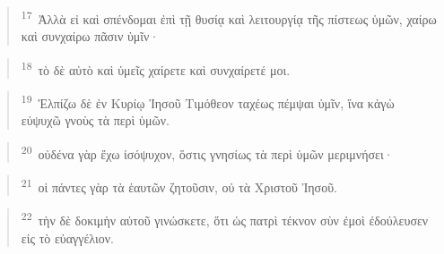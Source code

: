 \documentclass{article}
\newcommand{\currentverse}{1} %
\newcommand{\setcurrentverse}[1]{\renewcommand{\currentverse}{#1}}
\begin{document}
\begin{verse}

\setcurrentverse{17}

\setcounter{footnote}{0}

\textsuperscript{17}~Ἀλλὰ εἰ καὶ σπένδομαι ἐπὶ τῇ θυσίᾳ καὶ λειτουργίᾳ τῆς πίστεως ὑμῶν, χαίρω καὶ συνχαίρω πᾶσιν ὑμῖν·

\end{verse}

\begin{verse}

\setcurrentverse{18}

\setcounter{footnote}{0}

\textsuperscript{18}~τὸ δὲ αὐτὸ καὶ ὑμεῖς χαίρετε καὶ συνχαίρετέ μοι.

\end{verse}

\begin{verse}

\setcurrentverse{19}

\setcounter{footnote}{0}

\textsuperscript{19}~Ἐλπίζω δὲ ἐν Κυρίῳ Ἰησοῦ Τιμόθεον ταχέως πέμψαι ὑμῖν, ἵνα κἀγὼ εὐψυχῶ γνοὺς τὰ περὶ ὑμῶν.

\end{verse}

\begin{verse}

\setcurrentverse{20}

\setcounter{footnote}{0}

\textsuperscript{20}~οὐδένα γὰρ ἔχω ἰσόψυχον, ὅστις γνησίως τὰ περὶ ὑμῶν μεριμνήσει·

\end{verse}

\begin{verse}

\setcurrentverse{21}

\setcounter{footnote}{0}

\textsuperscript{21}~οἱ πάντες γὰρ τὰ ἑαυτῶν ζητοῦσιν, οὐ τὰ Χριστοῦ Ἰησοῦ.

\end{verse}

\begin{verse}

\setcurrentverse{22}

\setcounter{footnote}{0}

\textsuperscript{22}~τὴν δὲ δοκιμὴν αὐτοῦ γινώσκετε, ὅτι ὡς πατρὶ τέκνον σὺν ἐμοὶ ἐδούλευσεν εἰς τὸ εὐαγγέλιον.

\end{verse}
\end{document}
